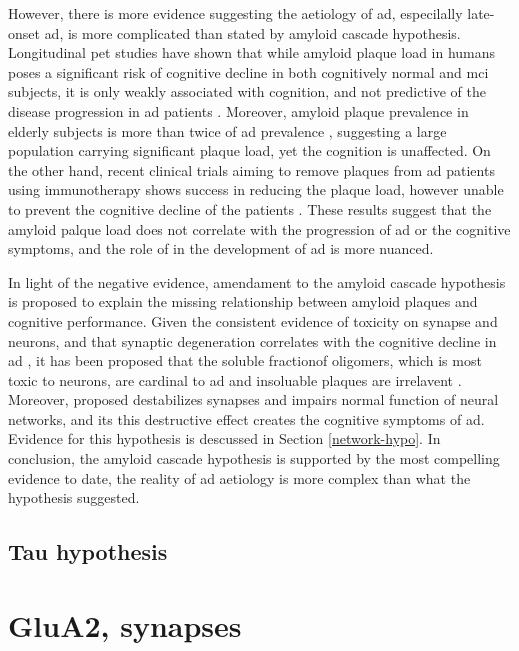 However, there is more evidence suggesting the aetiology of \gls{ad}, especilally late-onset \gls{ad}, is more complicated than stated by amyloid cascade hypothesis. Longitudinal \gls{pet} studies have shown that while amyloid plaque load in humans poses a significant risk of cognitive decline in both cognitively normal and \gls{mci} subjects, it is only weakly associated with cognition, and not predictive of the disease progression in \gls{ad} patients \citep{chen14}. Moreover, amyloid plaque prevalence in elderly subjects is more than twice of \gls{ad} prevalence \citep{rowe10, ad16}, suggesting a large population carrying significant plaque load, yet the cognition is unaffected. On the other hand, recent clinical trials aiming to remove plaques from \gls{ad} patients using immunotherapy shows success in reducing the plaque load, however unable to prevent the cognitive decline of the patients \citep{farlow15, siemers16, sevigny16}. These results suggest that the amyloid palque load does not correlate with the progression of \gls{ad} or the cognitive symptoms, and the role of \abeta in the development of \gls{ad} is more nuanced. 

In light of the negative evidence, amendament to the amyloid cascade hypothesis is proposed to explain the missing relationship between amyloid plaques and cognitive performance. Given the consistent evidence of \abeta toxicity on synapse and neurons\citep{ferreira15}, and that synaptic degeneration correlates with the cognitive decline in \gls{ad} \citep{selkoe02, coleman04}, it has been proposed that the soluble fractionof \abeta oligomers, which is most toxic to neurons, are cardinal to \gls{ad} and insoluable plaques are irrelavent \citep{ferreira15}. Moreover, \citet{cantor16} proposed \abeta destabilizes synapses and impairs normal function of neural networks, and its this destructive effect creates the cognitive symptoms of \gls{ad}. Evidence for this hypothesis is descussed in Section \ref{network-hypo}. In conclusion, the amyloid cascade hypothesis is supported by the most compelling evidence to date, the reality of \gls{ad} aetiology is more complex than what the hypothesis suggested.

\subsection{Tau hypothesis}


\section{GluA2, synapses}
